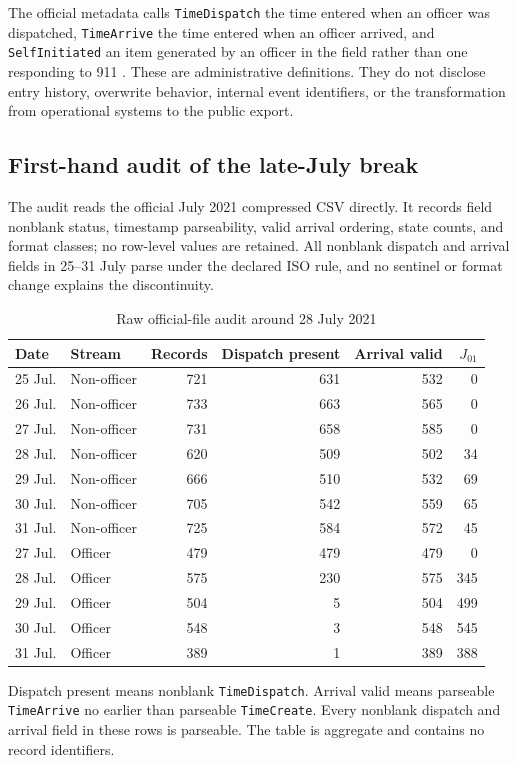 \documentclass[11pt]{article}
\begin{document}
The official metadata calls \texttt{TimeDispatch} the time entered when an officer was dispatched, \texttt{TimeArrive} the time entered when an officer arrived, and \texttt{SelfInitiated} an item generated by an officer in the field rather than one responding to 911 \citep{DataNOLA2021}. These are administrative definitions. They do not disclose entry history, overwrite behavior, internal event identifiers, or the transformation from operational systems to the public export.

\subsection{First-hand audit of the late-July break}

The audit reads the official July 2021 compressed CSV directly. It records field nonblank status, timestamp parseability, valid arrival ordering, state counts, and format classes; no row-level values are retained. All nonblank dispatch and arrival fields in 25--31 July parse under the declared ISO rule, and no sentinel or format change explains the discontinuity.

\begin{table}[t]
\centering
\caption{Raw official-file audit around 28 July 2021}
\label{tab:rawbreak}
\begin{tabular}{@{}llrrrr@{}}
\toprule
Date & Stream & Records & Dispatch present & Arrival valid & $J_{01}$ \\
\midrule
25 Jul. & Non-officer & 721 & 631 & 532 & 0 \\
26 Jul. & Non-officer & 733 & 663 & 565 & 0 \\
27 Jul. & Non-officer & 731 & 658 & 585 & 0 \\
28 Jul. & Non-officer & 620 & 509 & 502 & 34 \\
29 Jul. & Non-officer & 666 & 510 & 532 & 69 \\
30 Jul. & Non-officer & 705 & 542 & 559 & 65 \\
31 Jul. & Non-officer & 725 & 584 & 572 & 45 \\
\midrule
27 Jul. & Officer & 479 & 479 & 479 & 0 \\
28 Jul. & Officer & 575 & 230 & 575 & 345 \\
29 Jul. & Officer & 504 & 5 & 504 & 499 \\
30 Jul. & Officer & 548 & 3 & 548 & 545 \\
31 Jul. & Officer & 389 & 1 & 389 & 388 \\
\bottomrule
\end{tabular}
\begin{minipage}{0.96\textwidth}\footnotesize
Dispatch present means nonblank \texttt{TimeDispatch}. Arrival valid means parseable \texttt{TimeArrive} no earlier than parseable \texttt{TimeCreate}. Every nonblank dispatch and arrival field in these rows is parseable. The table is aggregate and contains no record identifiers.
\end{minipage}
\end{table}
\end{document}
